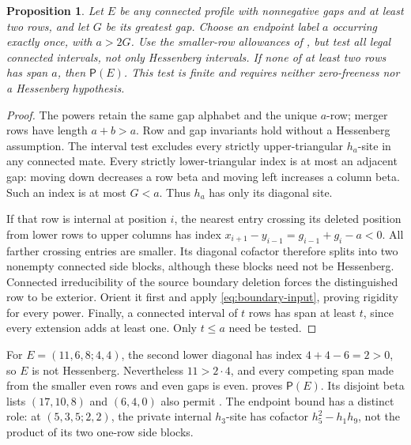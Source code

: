 \documentclass[11pt,a4paper]{amsart}
\numberwithin{equation}{section}
\theoremstyle{plain}
\newtheorem{proposition}[theorem]{Proposition}
\theoremstyle{definition}
\begin{document}
\begin{proposition}\label{prop:general-private-endpoint}
Let \(E\) be any connected profile with nonnegative gaps and at least two rows, and let \(G\) be its greatest gap.  Choose an endpoint label \(a\) occurring exactly once, with \(a>2G\).  Use the smaller-row allowances of , but test all legal connected intervals, not only Hessenberg intervals.  If none of at least two rows has span \(a\), then \(\mathsf P(E)\).  This test is finite and requires neither zero-freeness nor a Hessenberg hypothesis.
\end{proposition}
\begin{proof}
The powers retain the same gap alphabet and the unique \(a\)-row; merger rows have length \(a+b>a\).  Row and gap invariants hold without a Hessenberg assumption.  The interval test excludes every strictly upper-triangular \(h_a\)-site in any connected mate.  Every strictly lower-triangular index is at most an adjacent gap: moving down decreases a row beta and moving left increases a column beta.  Such an index is at most \(G<a\).  Thus \(h_a\) has only its diagonal site.

If that row is internal at position \(i\), the nearest entry crossing its deleted position from lower rows to upper columns has index \(x_{i+1}-y_{i-1}=g_{i-1}+g_i-a<0\).  All farther crossing entries are smaller.  Its diagonal cofactor therefore splits into two nonempty connected side blocks, although these blocks need not be Hessenberg.  Connected irreducibility of the source boundary deletion forces the distinguished row to be exterior.  Orient it first and apply \eqref{eq:boundary-input}, proving rigidity for every power.  Finally, a connected interval of \(t\) rows has span at least \(t\), since every extension adds at least one.  Only \(t\le a\) need be tested.
\end{proof}

For \(E=(11,6,8;4,4)\), the second lower diagonal has index \(4+4-6=2>0\), so \(E\) is not Hessenberg.  Nevertheless \(11>2\cdot4\), and every competing span made from the smaller even rows and even gaps is even.   proves \(\mathsf P(E)\).  Its disjoint beta lists \((17,10,8)\) and \((6,4,0)\) also permit .  The endpoint bound has a distinct role: at \((5,3,5;2,2)\), the private internal \(h_3\)-site has cofactor \(h_5^2-h_1h_9\), not the product of its two one-row side blocks.
\end{document}

